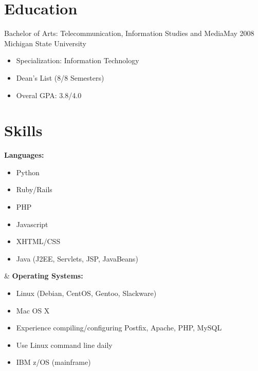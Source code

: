 \documentclass[]{res}
\begin{document}
\begin{resume}
\section{Education}
Bachelor of Arts: Telecommunication, Information Studies and Media\dotfill May 2008\\
Michigan State University
\begin{itemize}
\item Specialization: Information Technology
\item Dean's List (8/8 Semesters)
\item Overal GPA: 3.8/4.0
\end{itemize}


\section{Skills}
\begin{ncolumn}{2}
  {\bf Languages:}
  \begin{itemize}
  \item Python
  \item Ruby/Rails
  \item PHP
  \item Javascript
  \item XHTML/CSS
  \item Java (J2EE, Servlets, JSP, JavaBeans)
  \end{itemize}
&
  {\bf Operating Systems:}
  \begin{itemize}
  \item Linux (Debian, CentOS, Gentoo, Slackware)
  \item Mac OS X
  \item Experience compiling/configuring Postfix, Apache, PHP, MySQL
  \item Use Linux command line daily
  \item IBM z/OS (mainframe)
  \end{itemize}
\end{ncolumn}


\end{resume}
\end{document}
